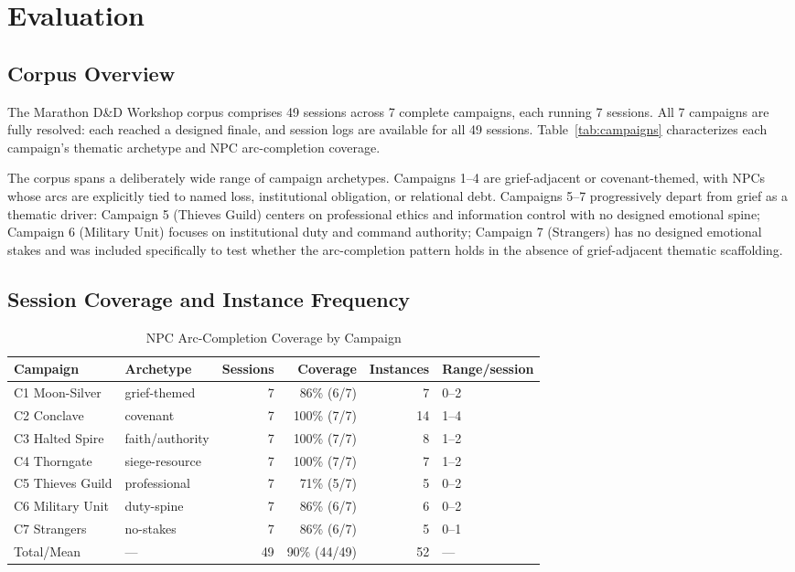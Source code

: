 
\section{Evaluation}
\label{sec:evaluation}

\subsection{Corpus Overview}

The Marathon D\&D Workshop corpus comprises 49 sessions across 7 complete
campaigns, each running 7 sessions. All 7 campaigns are fully resolved:
each reached a designed finale, and session logs are available for all
49 sessions. Table~\ref{tab:campaigns} characterizes each campaign's
thematic archetype and NPC arc-completion coverage.

The corpus spans a deliberately wide range of campaign archetypes. Campaigns
1--4 are grief-adjacent or covenant-themed, with NPCs whose arcs are
explicitly tied to named loss, institutional obligation, or relational debt.
Campaigns 5--7 progressively depart from grief as a thematic driver:
Campaign 5 (Thieves Guild) centers on professional ethics and information
control with no designed emotional spine; Campaign 6 (Military Unit) focuses
on institutional duty and command authority; Campaign 7 (Strangers) has no
designed emotional stakes and was included specifically to test whether the
arc-completion pattern holds in the absence of grief-adjacent thematic
scaffolding.

\subsection{Session Coverage and Instance Frequency}

\begin{table}[t]
\caption{NPC Arc-Completion Coverage by Campaign}
\label{tab:coverage}
\begin{tabular}{@{}llrrrl@{}}
\toprule
\textbf{Campaign} & \textbf{Archetype} & \textbf{Sessions} &
\textbf{Coverage} & \textbf{Instances} & \textbf{Range/session} \\
\midrule
C1 Moon-Silver   & grief-themed     & 7 & 86\% (6/7) &  7 & 0--2 \\
C2 Conclave      & covenant         & 7 & 100\% (7/7) & 14 & 1--4 \\
C3 Halted Spire  & faith/authority  & 7 & 100\% (7/7) &  8 & 1--2 \\
C4 Thorngate     & siege-resource   & 7 & 100\% (7/7) &  7 & 1--2 \\
C5 Thieves Guild & professional     & 7 & 71\% (5/7)  &  5 & 0--2 \\
C6 Military Unit & duty-spine       & 7 & 86\% (6/7)  &  6 & 0--2 \\
C7 Strangers     & no-stakes        & 7 & 86\% (6/7)  &  5 & 0--1 \\
\midrule
Total/Mean       & ---              & 49 & 90\% (44/49) & 52 & --- \\
\bottomrule
\end{tabular}
\end{table}

